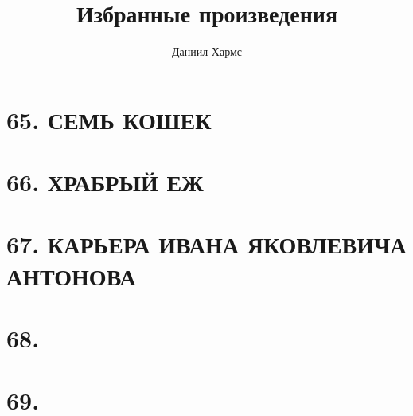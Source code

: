\documentclass[oneside]{book}
\title{Избранные произведения}
\author{Даниил Хармс}
\date{}
\begin{document}
\maketitle{}
\chapter*{65. СЕМЬ  КОШЕК}


\chapter*{66. ХРАБРЫЙ  ЕЖ}


\chapter*{67. КАРЬЕРА ИВАНА ЯКОВЛЕВИЧА АНТОНОВА}


\chapter*{68.}


\chapter*{69.}

\end{document}
